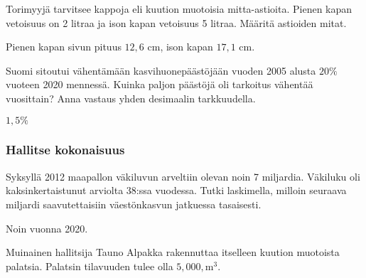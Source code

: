 \begin{tehtavasivu}
\begin{tehtava}%
Torimyyjä tarvitsee kappoja eli kuution muotoisia mitta-astioita. Pienen kapan vetoisuus on 2 litraa ja ison kapan vetoisuus 5 litraa. Määritä astioiden mitat.
\begin{vastaus}
Pienen kapan sivun pituus $12,6$ cm, ison kapan $17,1$ cm. 
\end{vastaus}
\end{tehtava}

\begin{tehtava}%
Suomi sitoutui vähentämään kasvihuonepäästöjään vuoden 2005 alusta $20\%$ vuoteen 2020 mennessä. Kuinka paljon päästöjä oli tarkoitus vähentää vuosittain? Anna vastaus yhden desimaalin tarkkuudella.
\begin{vastaus}
$1,5\%$
\end{vastaus}
\end{tehtava}

\subsubsection*{Hallitse kokonaisuus}
\begin{tehtava}%
Syksyllä 2012 maapallon väkiluvun arveltiin olevan noin 7 miljardia. Väkiluku oli kaksinkertaistunut arviolta 38:ssa vuodessa. Tutki laskimella, milloin seuraava miljardi saavutettaisiin väestönkasvun jatkuessa tasaisesti.
\begin{vastaus}
Noin vuonna 2020.
\end{vastaus}
\end{tehtava}

\begin{tehtava}
Muinainen hallitsija Tauno Alpakka rakennuttaa itselleen kuution muotoista palatsia.  Palatsin tilavuuden tulee olla $5,000,\mathrm{m}^3$. 
\begin{alakohdat}
\end{alakohdat}
\begin{vastaus}
\begin{alakohdat}
\end{alakohdat}
\end{vastaus}
\end{tehtava}


\end{tehtavasivu}
